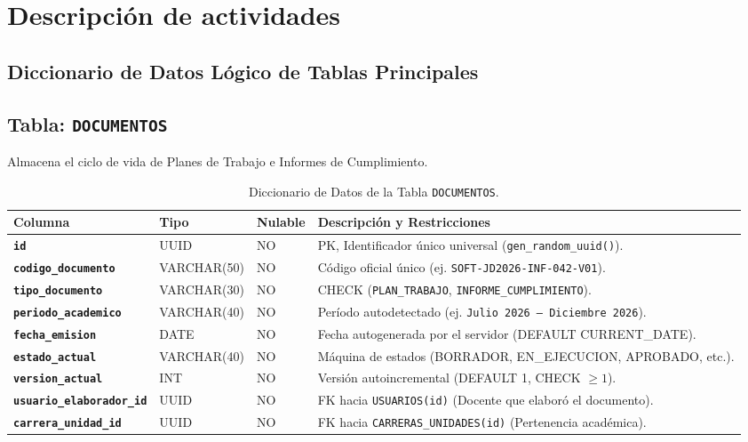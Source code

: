 \documentclass[12pt,a4paper]{article}
\begin{document}
\section{Descripción de actividades}

\subsection{Diccionario de Datos Lógico de Tablas Principales}

\subsection{Tabla: \texttt{DOCUMENTOS}}
Almacena el ciclo de vida de Planes de Trabajo e Informes de Cumplimiento.

\begin{table}[htbp]
\centering
\small
\begin{tabularx}{\textwidth}{|>{\hsize=0.65\hsize\bfseries}X|>{\hsize=0.5\hsize}X|>{\hsize=0.35\hsize\centering\arraybackslash}X|>{\hsize=1.5\hsize}X|}
    \hline
    \rowcolor{tableheader}
    Columna & Tipo & Nulable & Descripción y Restricciones \\
    \hline
    \texttt{id} & UUID & NO & PK, Identificador único universal (\texttt{gen\_random\_uuid()}). \\
    \hline
    \texttt{codigo\_documento} & VARCHAR(50) & NO & Código oficial único (ej. \texttt{SOFT-JD2026-INF-042-V01}). \\
    \hline
    \texttt{tipo\_documento} & VARCHAR(30) & NO & CHECK (\texttt{PLAN\_TRABAJO}, \texttt{INFORME\_CUMPLIMIENTO}). \\
    \hline
    \texttt{periodo\_academico} & VARCHAR(40) & NO & Período autodetectado (ej. \texttt{Julio 2026 -- Diciembre 2026}). \\
    \hline
    \texttt{fecha\_emision} & DATE & NO & Fecha autogenerada por el servidor (DEFAULT CURRENT\_DATE). \\
    \hline
    \texttt{estado\_actual} & VARCHAR(40) & NO & Máquina de estados (BORRADOR, EN\_EJECUCION, APROBADO, etc.). \\
    \hline
    \texttt{version\_actual} & INT & NO & Versión autoincremental (DEFAULT 1, CHECK $\ge 1$). \\
    \hline
    \texttt{usuario\_elaborador\_id} & UUID & NO & FK hacia \texttt{USUARIOS(id)} (Docente que elaboró el documento). \\
    \hline
    \texttt{carrera\_unidad\_id} & UUID & NO & FK hacia \texttt{CARRERAS\_UNIDADES(id)} (Pertenencia académica). \\
    \hline
\end{tabularx}
\caption{Diccionario de Datos de la Tabla \texttt{DOCUMENTOS}.}
\label{tab:s2_04_doc}
\end{table}
\end{document}
